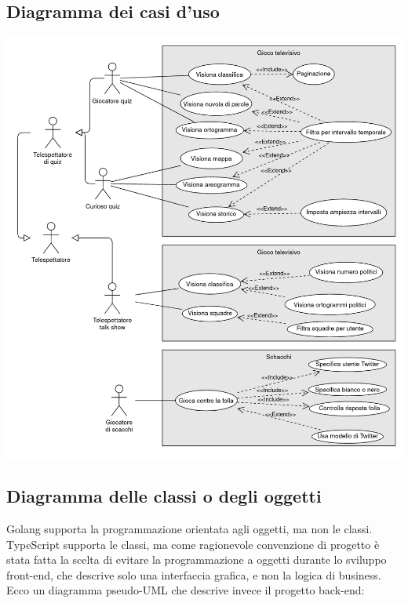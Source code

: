 \documentclass{article}
\begin{document}
\subsection{Diagramma dei casi d'uso}

\includegraphics[width=\textwidth]{use-cases.png}

\subsection{Diagramma delle classi o degli oggetti}

Golang supporta la programmazione orientata agli oggetti, ma non le classi.
TypeScript supporta le classi, ma come ragionevole convenzione di progetto è
stata fatta la scelta di evitare la programmazione a oggetti durante lo
sviluppo front-end, che descrive solo una interfaccia grafica, e non la logica
di business. Ecco un diagramma pseudo-UML che descrive invece il progetto
back-end:
\end{document}
